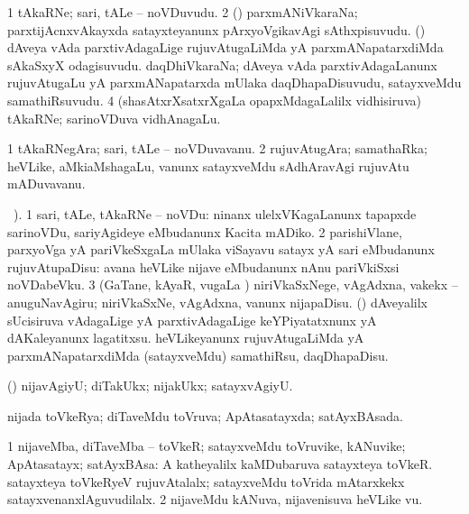 \bentry
{} 
\gl{\nA}
\expl{}
\bmng
\bnum
\num{1} tAkaRNe; sari, tALe -- noVDuvudu. 
\num{2} (\tashA) parxmANiVkaraNa; parxtijAcnxvAkayxda satayxteyanunx pArxyoVgikavAgi sAthxpisuvudu. 
\banum
{} (\nAyxshA) dAveya vAda parxtivAdagaLige rujuvAtugaLiMda yA parxmANapatarxdiMda sAkaSxyX odagisuvudu. 
 daqDhiVkaraNa; dAveya vAda parxtivAdagaLanunx rujuvAtugaLu yA parxmANapatarxda mUlaka daqDhapaDisuvudu, satayxveMdu samathiRsuvudu. 
\eanum
\numie
\num{4} (shasAtxrXsatxrXgaLa opapxMdagaLalilx vidhisiruva) tAkaRNe; sarinoVDuva vidhAnagaLu. 
\enum
\emng
\eentry

\bentry
{} 
\gl{\nA}
\expl{}
\bmng
\bnum
\num{1} tAkaRNegAra; sari, tALe -- noVDuvavanu. 
\num{2} rujuvAtugAra; samathaRka; heVLike, aMkiaMshagaLu, \mo vanunx satayxveMdu sAdhAravAgi rujuvAtu mADuvavanu. 
\enum
\emng
\eentry

\bentry
{} 
\gl{\sakirx}
\BUkaq\ ). \bmng
\bnum
\num{1} sari, tALe, tAkaRNe -- noVDu:  ninanx ulelxVKagaLanunx tapapxde sarinoVDu, sariyAgideye eMbudanunx Kacita mADiko. 
\num{2} parishiVlane, parxyoVga yA pariVkeSxgaLa mUlaka viSayavu satayx yA sari eMbudanunx rujuvAtupaDisu:  avana heVLike nijave eMbudanunx nAnu pariVkiSxsi noVDabeVku. 
\num{3} (GaTane, kAyaR, \mo vugaLa \vi) niriVkaSxNege, vAgAdxna, \mo vakekx -- anuguNavAgiru; niriVkaSxNe, vAgAdxna, \mo vanunx nijapaDisu. 
 (\nAyxshA) 
\banum
{} dAveyalilx sUcisiruva vAdagaLige yA parxtivAdagaLige keYPiyatatxnunx yA dAKaleyanunx lagatitxsu. 
 heVLikeyanunx rujuvAtugaLiMda yA parxmANapatarxdiMda (satayxveMdu) samathiRsu, daqDhapaDisu. 
\eanum
\numie
\enum
\emng
\eentry

\bentry
{} 
\gl{\kirxvi}
\expl{}
\bmng
 (\pArxparx) nijavAgiyU; diTakUkx; nijakUkx; satayxvAgiyU. 
\emng
\eentry

\bentry
{} 
\gl{\gu}
\expl{}
\bmng
 nijada toVkeRya; diTaveMdu toVruva; ApAtasatayxda; satAyxBAsada. 
\emng
\eentry

\bentry
{} 
\gl{\nA}
\expl{}
\bmng
\bnum
\num{1} nijaveMba, diTaveMba -- toVkeR; satayxveMdu toVruvike, kANuvike; ApAtasatayx; satAyxBAsa:  A katheyalilx kaMDubaruva satayxteya toVkeR.  satayxteya toVkeRyeV rujuvAtalalx; satayxveMdu toVrida mAtarxkekx satayxvenanxlAguvudilalx. 
\num{2} nijaveMdu kANuva, nijavenisuva heVLike \mo vu. 
\enum
\emng
\eentry

